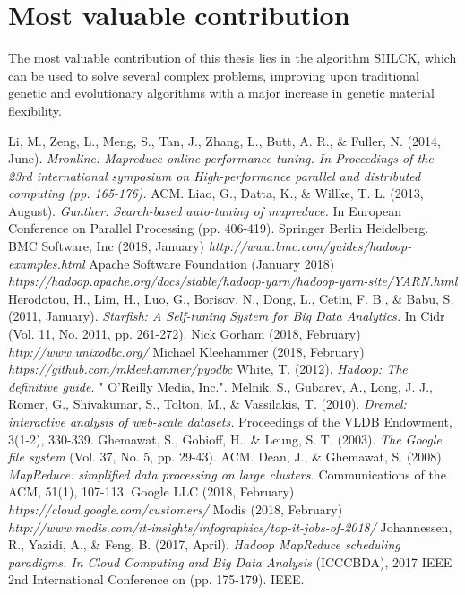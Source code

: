 \documentclass[a4paper,english]{report}
\begin{document}
		\section{Most valuable contribution}
		The most valuable contribution of this thesis lies in the algorithm SIILCK, which can be used to solve several complex problems, improving upon traditional genetic and evolutionary algorithms with a major increase in genetic material flexibility.
	\begin{thebibliography}{1}
		Li, M., Zeng, L., Meng, S., Tan, J., Zhang, L., Butt, A. R., \& Fuller, N. (2014, June). \emph{Mronline: Mapreduce online performance tuning. In Proceedings of the 23rd international symposium on High-performance parallel and distributed computing (pp. 165-176).} ACM.
		Liao, G., Datta, K., \& Willke, T. L. (2013, August). \emph{Gunther: Search-based auto-tuning of mapreduce.} In European Conference on Parallel Processing (pp. 406-419). Springer Berlin Heidelberg.
		BMC Software, Inc (2018, January) \emph{http://www.bmc.com/guides/hadoop-examples.html}
		Apache Software Foundation (January 2018) \emph{https://hadoop.apache.org/docs/stable/hadoop-yarn/hadoop-yarn-site/YARN.html}
		Herodotou, H., Lim, H., Luo, G., Borisov, N., Dong, L., Cetin, F. B., \& Babu, S. (2011, January). \emph{Starfish: A Self-tuning System for Big Data Analytics.} In Cidr (Vol. 11, No. 2011, pp. 261-272).
		Nick Gorham (2018, February) \emph{http://www.unixodbc.org/}
		Michael Kleehammer (2018, February) \emph{https://github.com/mkleehammer/pyodbc}
		White, T. (2012). \emph{Hadoop: The definitive guide.} " O'Reilly Media, Inc.".
		Melnik, S., Gubarev, A., Long, J. J., Romer, G., Shivakumar, S., Tolton, M., \& Vassilakis, T. (2010). \emph{Dremel: interactive analysis of web-scale datasets.} Proceedings of the VLDB Endowment, 3(1-2), 330-339.
		Ghemawat, S., Gobioff, H., \& Leung, S. T. (2003). \emph{The Google file system} (Vol. 37, No. 5, pp. 29-43). ACM.
		Dean, J., \& Ghemawat, S. (2008). \emph{MapReduce: simplified data processing on large clusters.} Communications of the ACM, 51(1), 107-113.
		Google LLC (2018, February) \emph{https://cloud.google.com/customers/}
		Modis (2018, February) \emph{http://www.modis.com/it-insights/infographics/top-it-jobs-of-2018/}
		Johannessen, R., Yazidi, A., \& Feng, B. (2017, April). \emph{Hadoop MapReduce scheduling paradigms. In Cloud Computing and Big Data Analysis} (ICCCBDA), 2017 IEEE 2nd International Conference on (pp. 175-179). IEEE.

\end{thebibliography}
\end{document}
